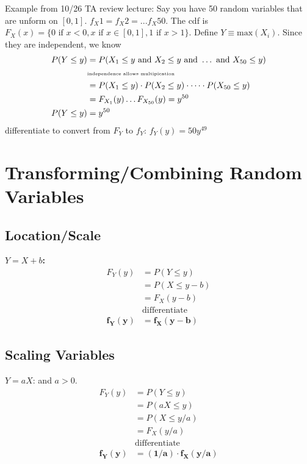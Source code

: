 Example from 10/26 TA review lecture: 
Say you have 50 random variables that are unform on $[0, 1]$.  $f_X1 = f_X2 = ... f_X50$.
The cdf is $F_X(x) = \{0 \mbox{ if } x < 0, x \mbox{ if } x \in [0, 1], 1 \mbox{ if } x > 1\}$.
Define $Y \equiv \mbox{max}(X_i)$.  Since they are independent, we know 
\begin{align*}
	P(Y \leq y) &= P(X_1 \leq y \mbox{ and } X_2 \leq y \mbox{ and }\dots \mbox{ and } X_{50} \leq y) \\
			& \mbox{\tiny independence allows multipication} \\
			&= P(X_1 \leq y) \cdot P(X_2 \leq y) \cdot \dots \cdot P(X_{50} \leq y) \\
			&= F_{X_1}(y) \dots F_{X_{50}}(y) =  y^{50} \\
		P(Y \leq y) &= y^{50} 
\end{align*}
{\tiny differentiate to convert from } $F_Y$ to $f_Y$:  $f_Y(y)=50y^{49}$
			
\section{Transforming/Combining Random Variables}
\subsection{Location/Scale}
\textbf{$Y = X + b$:} 
\begin{align*}
	F_Y(y) &= P(Y \leq y) \\
			&= P(X \leq y-b)  \\
			&= F_X(y - b)  \\
			& \mbox{differentiate} \\
	      \mathbf{f_Y(y)} & \mathbf{= f_X(y-b)}
\end{align*}

\subsection{Scaling Variables}
\textbf{$Y = aX $}: and $a > 0$. 
\begin{align*}
	F_Y(y) &= P(Y \leq y) \\
			&= P(aX \leq y)  \\
			&= P(X \leq y/a)  \\
			&= F_X(y/a)  \\
			& \mbox{differentiate} \\
		\mathbf{f_Y(y)} & \mathbf{= (1/a) \cdot f_X(y/a)}
\end{align*}


